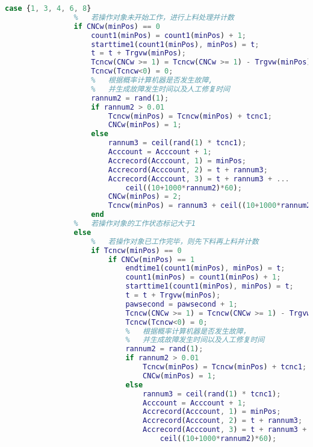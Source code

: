\documentclass[no-math,withoutpreface,bwprint]{cumcmthesis} %
\numberwithin{equation}{section}
\numberwithin{figure}{section}
\numberwithin{table}{section}
\begin{document}
\begin{lstlisting}[language=matlab]
            case {1, 3, 4, 6, 8}
                %   若操作对象未开始工作，进行上料处理并计数
                if CNCw(minPos) == 0
                    count1(minPos) = count1(minPos) + 1;
                    starttime1(count1(minPos), minPos) = t;
                    t = t + Trgvw(minPos);
                    Tcncw(CNCw >= 1) = Tcncw(CNCw >= 1) - Trgvw(minPos);
                    Tcncw(Tcncw<0) = 0;
                    %   根据概率计算机器是否发生故障,
                    %   并生成故障发生时间以及人工修复时间
                    rannum2 = rand(1);
                    if rannum2 > 0.01
                        Tcncw(minPos) = Tcncw(minPos) + tcnc1;
                        CNCw(minPos) = 1;
                    else
                        rannum3 = ceil(rand(1) * tcnc1);
                        Acccount = Acccount + 1;
                        Accrecord(Acccount, 1) = minPos;
                        Accrecord(Acccount, 2) = t + rannum3;
                        Accrecord(Acccount, 3) = t + rannum3 + ...
                            ceil((10+1000*rannum2)*60);
                        CNCw(minPos) = 2;
                        Tcncw(minPos) = rannum3 + ceil((10+1000*rannum2)*60);
                    end
                %   若操作对象的工作状态标记大于1
                else
                    %   若操作对象已工作完毕，则先下料再上料并计数
                    if Tcncw(minPos) == 0
                        if CNCw(minPos) == 1
                            endtime1(count1(minPos), minPos) = t;
                            count1(minPos) = count1(minPos) + 1;
                            starttime1(count1(minPos), minPos) = t;
                            t = t + Trgvw(minPos);
                            pawsecond = pawsecond + 1;
                            Tcncw(CNCw >= 1) = Tcncw(CNCw >= 1) - Trgvw(minPos);
                            Tcncw(Tcncw<0) = 0;
                            %   根据概率计算机器是否发生故障，
                            %   并生成故障发生时间以及人工修复时间
                            rannum2 = rand(1);
                            if rannum2 > 0.01
                                Tcncw(minPos) = Tcncw(minPos) + tcnc1;
                                CNCw(minPos) = 1;
                            else
                                rannum3 = ceil(rand(1) * tcnc1);
                                Acccount = Acccount + 1;
                                Accrecord(Acccount, 1) = minPos;
                                Accrecord(Acccount, 2) = t + rannum3;
                                Accrecord(Acccount, 3) = t + rannum3 + ...
                                    ceil((10+1000*rannum2)*60);

\end{lstlisting}
\end{document}
